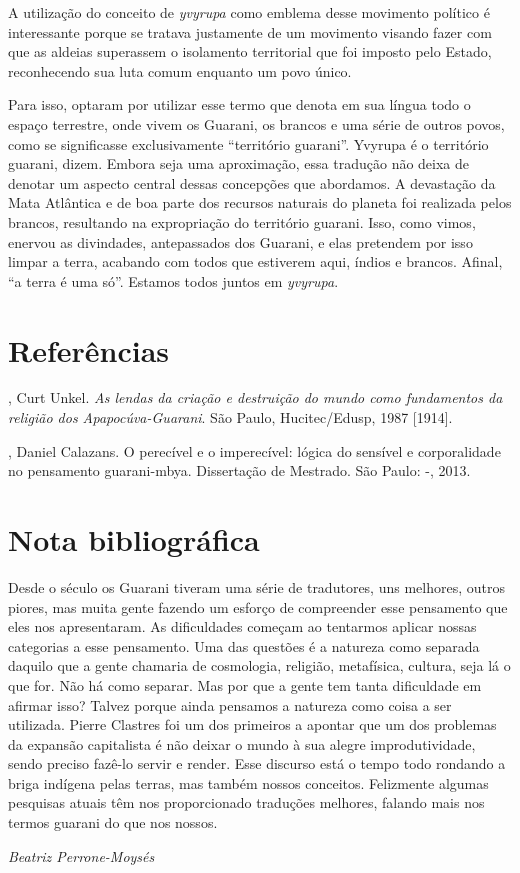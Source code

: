 A utilização do conceito de \emph{yvyrupa} como emblema desse movimento
político é interessante porque se tratava justamente de um movimento
visando fazer com que as aldeias superassem o isolamento territorial
que foi imposto pelo Estado, reconhecendo sua luta comum enquanto um
povo único.

Para isso, optaram por utilizar esse termo que denota em sua língua todo
o espaço terrestre, onde vivem os Guarani, os brancos e uma série de
outros povos, como se significasse exclusivamente ``território guarani''.
Yvyrupa é o território guarani, dizem. Embora seja uma aproximação,
essa tradução não deixa de denotar um aspecto central dessas concepções
que abordamos. A devastação da Mata Atlântica e de boa parte dos
recursos naturais do planeta foi realizada pelos brancos, resultando na
expropriação do território guarani. Isso, como vimos, enervou as
divindades, antepassados dos Guarani, e elas pretendem por isso limpar
a terra, acabando com todos que estiverem aqui, índios e brancos.
Afinal, ``a terra é uma só''. Estamos todos juntos em \emph{yvyrupa}.

\section{Referências}

\begin{Parskip}
, Curt Unkel. \emph{As lendas da criação e destruição do mundo
como fundamentos da religião dos Apapocúva-Guarani}. São Paulo,
Hucitec/Edusp, 1987 [1914].

, Daniel Calazans. O perecível e o imperecível: lógica do
sensível e corporalidade no pensamento guarani-mbya. Dissertação de
Mestrado. São Paulo: -, 2013.

\end{Parskip}

\section{Nota bibliográfica}
Desde o século  os Guarani tiveram uma série de tradutores, uns
melhores, outros piores, mas muita gente fazendo um esforço de
compreender esse pensamento que eles nos apresentaram. As dificuldades
começam ao tentarmos aplicar nossas categorias a esse pensamento. Uma
das questões é a natureza como separada daquilo que a gente chamaria de
cosmologia, religião, metafísica, cultura, seja lá o que for. Não há
como separar. Mas por que a gente tem tanta dificuldade em afirmar
isso? Talvez porque ainda pensamos a natureza como coisa a ser
utilizada. Pierre Clastres foi um dos primeiros a apontar que um dos
problemas da expansão capitalista é não deixar o mundo à sua alegre
improdutividade, sendo preciso fazê-lo servir e render. Esse discurso
está o tempo todo rondando a briga indígena pelas terras, mas também
nossos conceitos. Felizmente algumas pesquisas atuais têm nos
proporcionado traduções melhores, falando mais nos termos guarani do
que nos nossos.
\medskip
\begin{flushright}
\emph{Beatriz Perrone-Moysés}
\end{flushright}


